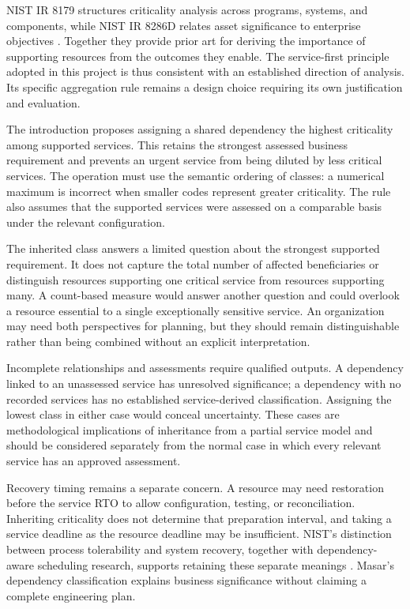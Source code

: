 NIST IR 8179 structures criticality analysis across programs, systems, and components, while NIST IR 8286D relates asset significance to enterprise objectives \cite{nist2018criticality,quinn2025bia}. Together they provide prior art for deriving the importance of supporting resources from the outcomes they enable. The service-first principle adopted in this project is thus consistent with an established direction of analysis. Its specific aggregation rule remains a design choice requiring its own justification and evaluation.

The introduction proposes assigning a shared dependency the highest criticality among supported services. This retains the strongest assessed business requirement and prevents an urgent service from being diluted by less critical services. The operation must use the semantic ordering of classes: a numerical maximum is incorrect when smaller codes represent greater criticality. The rule also assumes that the supported services were assessed on a comparable basis under the relevant configuration.

The inherited class answers a limited question about the strongest supported requirement. It does not capture the total number of affected beneficiaries or distinguish resources supporting one critical service from resources supporting many. A count-based measure would answer another question and could overlook a resource essential to a single exceptionally sensitive service. An organization may need both perspectives for planning, but they should remain distinguishable rather than being combined without an explicit interpretation.

Incomplete relationships and assessments require qualified outputs. A dependency linked to an unassessed service has unresolved significance; a dependency with no recorded services has no established service-derived classification. Assigning the lowest class in either case would conceal uncertainty. These cases are methodological implications of inheritance from a partial service model and should be considered separately from the normal case in which every relevant service has an approved assessment.

Recovery timing remains a separate concern. A resource may need restoration before the service RTO to allow configuration, testing, or reconciliation. Inheriting criticality does not determine that preparation interval, and taking a service deadline as the resource deadline may be insufficient. NIST's distinction between process tolerability and system recovery, together with dependency-aware scheduling research, supports retaining these separate meanings \cite{nist2010contingency,elshekeil2017precesion}. Masar's dependency classification explains business significance without claiming a complete engineering plan.

